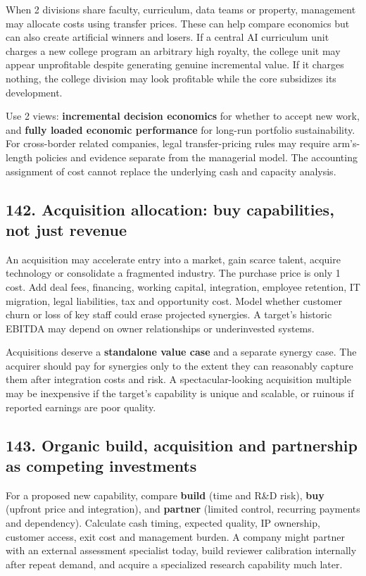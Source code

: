 When 2 divisions share faculty, curriculum, data teams or property, management may allocate costs using transfer prices. These can help compare economics but can also create artificial winners and losers. If a central AI curriculum unit charges a new college program an arbitrary high royalty, the college unit may appear unprofitable despite generating genuine incremental value. If it charges nothing, the college division may look profitable while the core subsidizes its development.

Use 2 views: \textbf{incremental decision economics} for whether to accept new work, and \textbf{fully loaded economic performance} for long-run portfolio sustainability. For cross-border related companies, legal transfer-pricing rules may require arm's-length policies and evidence separate from the managerial model. The accounting assignment of cost cannot replace the underlying cash and capacity analysis.

\subsection{142. Acquisition allocation: buy capabilities, not just revenue}


An acquisition may accelerate entry into a market, gain scarce talent, acquire technology or consolidate a fragmented industry. The purchase price is only 1 cost. Add deal fees, financing, working capital, integration, employee retention, IT migration, legal liabilities, tax and opportunity cost. Model whether customer churn or loss of key staff could erase projected synergies. A target's historic EBITDA may depend on owner relationships or underinvested systems.

Acquisitions deserve a \textbf{standalone value case} and a separate synergy case. The acquirer should pay for synergies only to the extent they can reasonably capture them after integration costs and risk. A spectacular-looking acquisition multiple may be inexpensive if the target's capability is unique and scalable, or ruinous if reported earnings are poor quality.

\subsection{143. Organic build, acquisition and partnership as competing investments}


For a proposed new capability, compare \textbf{build} (time and R\&D risk), \textbf{buy} (upfront price and integration), and \textbf{partner} (limited control, recurring payments and dependency). Calculate cash timing, expected quality, IP ownership, customer access, exit cost and management burden. A company might partner with an external assessment specialist today, build reviewer calibration internally after repeat demand, and acquire a specialized research capability much later.

